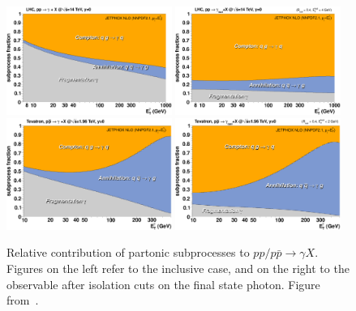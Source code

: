 \begin{figure}[ht]
\centering
\includegraphics[width=0.48\textwidth]{3-PDFdet/figs/subproc_ppgamma_jetphox_lhc_inc_stack.eps}
\includegraphics[width=0.48\textwidth]{3-PDFdet/figs/subproc_ppgamma_jetphox_lhc_is_stack.eps}\\
\includegraphics[width=0.48\textwidth]{3-PDFdet/figs/subproc_ppgamma_jetphox_tevatron_inc_stack.eps}
\includegraphics[width=0.48\textwidth]{3-PDFdet/figs/subproc_ppgamma_jetphox_tevatron_is_stack.eps}
\caption[Relative contribution of partonic subprocesses to $pp/p\bar{p}\to \gamma X$]{Relative contribution of partonic subprocesses to $pp/p\bar{p}\to \gamma X$. Figures on the left refer to the inclusive case, and on the right to the observable after isolation cuts on the final state photon. Figure from~\cite{dEnterria:2012yj}. }
\label{fig:jrpromptphoton}
\end{figure}

